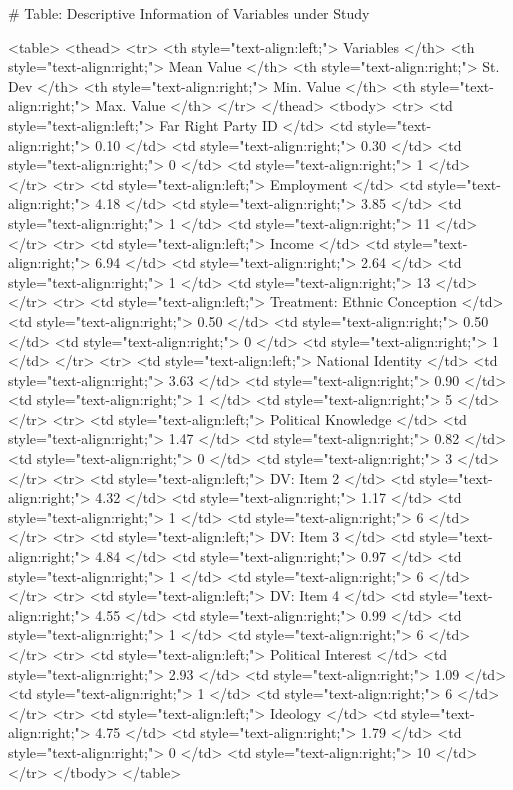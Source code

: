 # Table: Descriptive Information of Variables under Study 

<table>
 <thead>
  <tr>
   <th style="text-align:left;"> Variables </th>
   <th style="text-align:right;"> Mean Value </th>
   <th style="text-align:right;"> St. Dev </th>
   <th style="text-align:right;"> Min. Value </th>
   <th style="text-align:right;"> Max. Value </th>
  </tr>
 </thead>
<tbody>
  <tr>
   <td style="text-align:left;"> Far Right Party ID </td>
   <td style="text-align:right;"> 0.10 </td>
   <td style="text-align:right;"> 0.30 </td>
   <td style="text-align:right;"> 0 </td>
   <td style="text-align:right;"> 1 </td>
  </tr>
  <tr>
   <td style="text-align:left;"> Employment </td>
   <td style="text-align:right;"> 4.18 </td>
   <td style="text-align:right;"> 3.85 </td>
   <td style="text-align:right;"> 1 </td>
   <td style="text-align:right;"> 11 </td>
  </tr>
  <tr>
   <td style="text-align:left;"> Income </td>
   <td style="text-align:right;"> 6.94 </td>
   <td style="text-align:right;"> 2.64 </td>
   <td style="text-align:right;"> 1 </td>
   <td style="text-align:right;"> 13 </td>
  </tr>
  <tr>
   <td style="text-align:left;"> Treatment: Ethnic Conception </td>
   <td style="text-align:right;"> 0.50 </td>
   <td style="text-align:right;"> 0.50 </td>
   <td style="text-align:right;"> 0 </td>
   <td style="text-align:right;"> 1 </td>
  </tr>
  <tr>
   <td style="text-align:left;"> National Identity </td>
   <td style="text-align:right;"> 3.63 </td>
   <td style="text-align:right;"> 0.90 </td>
   <td style="text-align:right;"> 1 </td>
   <td style="text-align:right;"> 5 </td>
  </tr>
  <tr>
   <td style="text-align:left;"> Political Knowledge </td>
   <td style="text-align:right;"> 1.47 </td>
   <td style="text-align:right;"> 0.82 </td>
   <td style="text-align:right;"> 0 </td>
   <td style="text-align:right;"> 3 </td>
  </tr>
  <tr>
   <td style="text-align:left;"> DV: Item 2 </td>
   <td style="text-align:right;"> 4.32 </td>
   <td style="text-align:right;"> 1.17 </td>
   <td style="text-align:right;"> 1 </td>
   <td style="text-align:right;"> 6 </td>
  </tr>
  <tr>
   <td style="text-align:left;"> DV: Item 3 </td>
   <td style="text-align:right;"> 4.84 </td>
   <td style="text-align:right;"> 0.97 </td>
   <td style="text-align:right;"> 1 </td>
   <td style="text-align:right;"> 6 </td>
  </tr>
  <tr>
   <td style="text-align:left;"> DV: Item 4 </td>
   <td style="text-align:right;"> 4.55 </td>
   <td style="text-align:right;"> 0.99 </td>
   <td style="text-align:right;"> 1 </td>
   <td style="text-align:right;"> 6 </td>
  </tr>
  <tr>
   <td style="text-align:left;"> Political Interest </td>
   <td style="text-align:right;"> 2.93 </td>
   <td style="text-align:right;"> 1.09 </td>
   <td style="text-align:right;"> 1 </td>
   <td style="text-align:right;"> 6 </td>
  </tr>
  <tr>
   <td style="text-align:left;"> Ideology </td>
   <td style="text-align:right;"> 4.75 </td>
   <td style="text-align:right;"> 1.79 </td>
   <td style="text-align:right;"> 0 </td>
   <td style="text-align:right;"> 10 </td>
  </tr>
</tbody>
</table>
